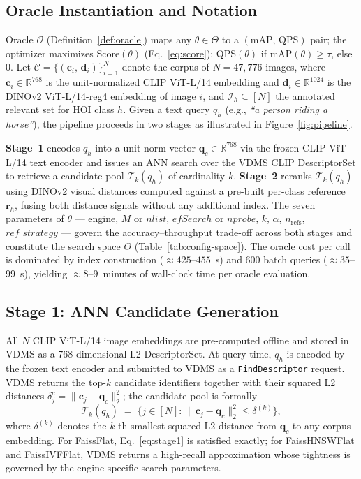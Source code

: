 \documentclass[sigconf, nonacm]{acmart}
\theoremstyle{definition}
\begin{document}
\subsection{Oracle Instantiation and Notation}

Oracle $\mathcal{O}$ (Definition~\ref{def:oracle}) maps any $\theta \in \Theta$ to a
$(\mathrm{mAP},\,\mathrm{QPS})$ pair; the optimizer maximizes
$\mathrm{Score}(\theta)$ (Eq.~\eqref{eq:score}): $\mathrm{QPS}(\theta)$ if
$\mathrm{mAP}(\theta) \geq \tau$, else $0$.
Let $\mathcal{C} = \{(\mathbf{c}_i,\,\mathbf{d}_i)\}_{i=1}^{N}$ denote the corpus
of $N{=}47{,}776$ images, where $\mathbf{c}_i \in \mathbb{R}^{768}$ is the
unit-normalized CLIP ViT-L/14 embedding and $\mathbf{d}_i \in \mathbb{R}^{1024}$
is the DINOv2 ViT-L/14-reg4 embedding of image $i$,
and $\mathcal{I}_h \subseteq [N]$ the annotated relevant set for HOI class $h$.
Given a text query $q_h$ (e.g., \textit{``a person riding a horse''}), the pipeline
proceeds in two stages as illustrated in Figure~\ref{fig:pipeline}.

\textbf{Stage~1} encodes $q_h$ into a unit-norm vector $\mathbf{q}_c \in \mathbb{R}^{768}$
via the frozen CLIP ViT-L/14 text encoder and issues an ANN search over the VDMS
CLIP DescriptorSet to retrieve a candidate pool $\mathcal{T}_k(q_h)$ of cardinality $k$.
\textbf{Stage~2} reranks $\mathcal{T}_k(q_h)$ using DINOv2 visual distances computed
against a pre-built per-class reference $\mathbf{r}_h$, fusing both distance signals
without any additional index.
The seven parameters of $\theta$ --- engine, $M$ or $\mathit{nlist}$,
$\mathit{efSearch}$ or $\mathit{nprobe}$, $k$, $\alpha$, $n_{\mathrm{refs}}$,
$\mathit{ref\_strategy}$ --- govern the accuracy--throughput trade-off across both
stages and constitute the search space $\Theta$ (Table~\ref{tab:config-space}).
The oracle cost per call is dominated by index construction (${\approx}425$--$455$~s)
and 600 batch queries (${\approx}35$--$99$~s), yielding ${\approx}8$--$9$~minutes
of wall-clock time per oracle evaluation.

\subsection{Stage 1: ANN Candidate Generation}
\label{sec:stage1}

All $N$ CLIP ViT-L/14 image embeddings are pre-computed offline and stored in VDMS as
a 768-dimensional L2 DescriptorSet.
At query time, $q_h$ is encoded by the frozen text encoder and submitted to VDMS
as a \texttt{FindDescriptor} request.
VDMS returns the top-$k$ candidate identifiers together with their squared L2 distances
$\delta_j^c = \|\mathbf{c}_j - \mathbf{q}_c\|_2^2$; the candidate pool is formally
\begin{equation}
  \mathcal{T}_k(q_h) \;=\; \bigl\{j \in [N] :\,\|\mathbf{c}_j - \mathbf{q}_c\|_2^2
    \leq \delta^{(k)}\bigr\} ,
  \label{eq:stage1}
\end{equation}
where $\delta^{(k)}$ denotes the $k$-th smallest squared L2 distance from $\mathbf{q}_c$ to
any corpus embedding.
For FaissFlat, Eq.~\eqref{eq:stage1} is satisfied exactly; for FaissHNSWFlat and
FaissIVFFlat, VDMS returns a high-recall approximation whose tightness is governed
by the engine-specific search parameters.
\end{document}
